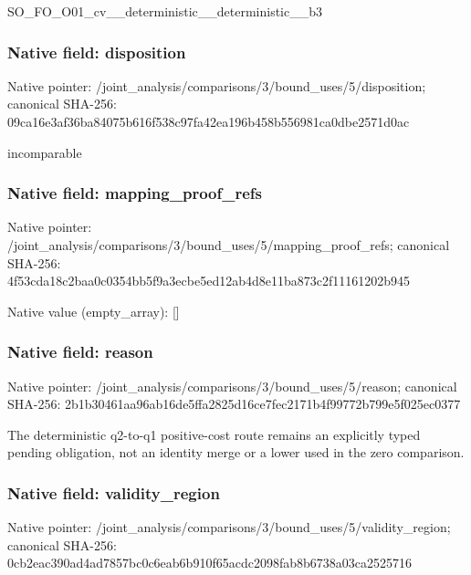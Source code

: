 \documentclass[10pt,a4paper]{article}
\begin{document}
\begingroup\raggedright\sloppy SO\_\allowbreak{}FO\_\allowbreak{}O01\_\allowbreak{}cv\_\allowbreak{}\_\allowbreak{}deterministic\_\allowbreak{}\_\allowbreak{}deterministic\_\allowbreak{}\_\allowbreak{}b3\par\endgroup

\subsubsection{Native field: disposition}
Native pointer: /joint\_\allowbreak{}analysis/comparisons/3/bound\_\allowbreak{}uses/5/disposition; canonical SHA-256: 09ca16e3af36ba84075b616f538c97fa42ea196b458b556981ca0dbe2571d0ac

\begingroup\raggedright\sloppy incomparable\par\endgroup

\subsubsection{Native field: mapping\_\allowbreak{}proof\_\allowbreak{}refs}
Native pointer: /joint\_\allowbreak{}analysis/comparisons/3/bound\_\allowbreak{}uses/5/mapping\_\allowbreak{}proof\_\allowbreak{}refs; canonical SHA-256: 4f53cda18c2baa0c0354bb5f9a3ecbe5ed12ab4d8e11ba873c2f11161202b945

Native value (empty\_\allowbreak{}array): []

\subsubsection{Native field: reason}
Native pointer: /joint\_\allowbreak{}analysis/comparisons/3/bound\_\allowbreak{}uses/5/reason; canonical SHA-256: 2b1b30461aa96ab16de5ffa2825d16ce7fec2171b4f99772b799e5f025ec0377

\begingroup\raggedright\sloppy The deterministic q2-to-q1 positive-cost route remains an explicitly typed pending obligation,\allowbreak{} not an identity merge or a lower used in the zero comparison.\par\endgroup

\subsubsection{Native field: validity\_\allowbreak{}region}
Native pointer: /joint\_\allowbreak{}analysis/comparisons/3/bound\_\allowbreak{}uses/5/validity\_\allowbreak{}region; canonical SHA-256: 0cb2eac390ad4ad7857bc0c6eab6b910f65acdc2098fab8b6738a03ca2525716
\end{document}
